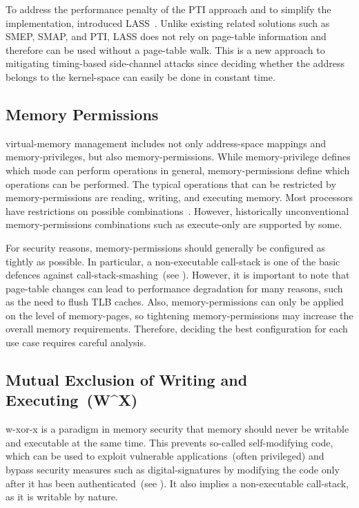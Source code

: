 To address the performance penalty of the \gls{PTI} approach and to simplify the implementation,  introduced \gls{LASS}~\cite{ia32-ext}. Unlike existing related solutions such as \gls{SMEP}, \gls{SMAP}, and \gls{PTI}, \gls{LASS} does not rely on \gls{page-table} information and therefore can be used without a \gls{page-table} walk. This is a new approach to mitigating timing-based \gls{side-channel} attacks since deciding whether the address belongs to the \gls{kernel-space} can easily be done in constant time.

\subsection{Memory Permissions}
\label{sec:mem_perms}

\Gls{virtual-memory} management includes not only \gls{address-space} mappings and \glspl{memory-privilege}, but also \gls{memory-permissions}. While \gls{memory-privilege} defines which  mode can perform operations in general, \gls{memory-permissions} define which operations can be performed. The typical operations that can be restricted by \gls{memory-permissions} are reading, writing, and executing memory. Most processors have restrictions on possible combinations~\cite{ia32}. However, historically unconventional \gls{memory-permissions} combinations such as execute-only are supported by some.

For security reasons, \gls{memory-permissions} should generally be configured as tightly as possible. In particular, a non-executable \gls{call-stack} is one of the basic defences against \gls{call-stack-smashing}~(see ). However, it is important to note that \gls{page-table} changes can lead to performance degradation for many reasons, such as the need to flush \gls{TLB} caches. Also, \gls{memory-permissions} can only be applied on the level of \glspl{memory-page}, so tightening \gls{memory-permissions} may increase the overall memory requirements. Therefore, deciding the best configuration for each use case requires careful analysis.

\subsection{Mutual Exclusion of Writing and Executing~(W\^{}X)}
\label{sec:mem_wxorx}

\Gls{w-xor-x} is a paradigm in memory security that memory should never be writable and executable at the same time. This prevents so-called self-modifying code, which can be used to exploit vulnerable applications~(often privileged) and bypass security measures such as \glspl{digital-signature} by modifying the code only after it has been authenticated~(see ). It also implies a non-executable \gls{call-stack}, as it is writable by nature.

